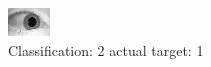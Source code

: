 \begin{figure}[h!]
\begin{center}
\includegraphics[width=0.60\columnwidth]{figures/ID1572_class_2_target_1.png}
\end{center}
\caption{ Classification: 2 actual target: 1}
\label{fig:ID1572_class_2_target_1}
\end{figure}
